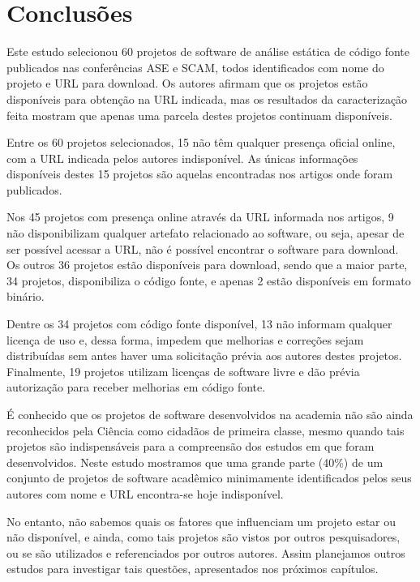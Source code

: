 \section{Conclusões} \label{estudo1:conclusoes} %

Este estudo selecionou 60 projetos de software de análise estática de código
fonte publicados nas conferências ASE e SCAM, todos identificados com nome do
projeto e URL para download. Os autores afirmam que os projetos estão
disponíveis para obtenção na URL indicada, mas os resultados da caracterização
feita mostram que apenas uma parcela destes projetos continuam disponíveis.

Entre os 60 projetos selecionados, 15 não têm qualquer presença oficial online,
com a URL indicada pelos autores indisponível. As únicas informações
disponíveis destes 15 projetos são aquelas encontradas nos artigos onde foram
publicados.

Nos 45 projetos com presença online através da URL informada nos artigos, 9 não
disponibilizam qualquer artefato relacionado ao software, ou seja, apesar de
ser possível acessar a URL, não é possível encontrar o software para download.
Os outros 36 projetos estão disponíveis para download, sendo que
a maior parte, 34 projetos, disponibiliza o código fonte, e apenas 2
estão disponíveis em formato binário.

Dentre os 34 projetos com código fonte disponível, 13 não informam qualquer
licença de uso e, dessa forma, impedem que melhorias e correções
sejam distribuídas sem antes haver uma solicitação prévia aos autores destes
projetos. Finalmente, 19 projetos utilizam licenças de software livre e dão
prévia autorização para receber melhorias em código fonte.

É conhecido que os projetos de software desenvolvidos na academia não são ainda
reconhecidos pela Ciência como cidadãos de primeira classe, mesmo quando tais
projetos são indispensáveis para a compreensão dos estudos em que foram
desenvolvidos. Neste estudo mostramos que uma grande parte (40\%) de um
conjunto de projetos de software acadêmico minimamente identificados pelos seus
autores com nome e URL encontra-se hoje indisponível.

No entanto, não sabemos quais os fatores que influenciam um projeto estar ou não
disponível, e ainda, como tais projetos são vistos por outros pesquisadores, ou se
são utilizados e referenciados por outros autores. Assim planejamos outros
estudos para investigar tais questões, apresentados nos próximos capítulos.

